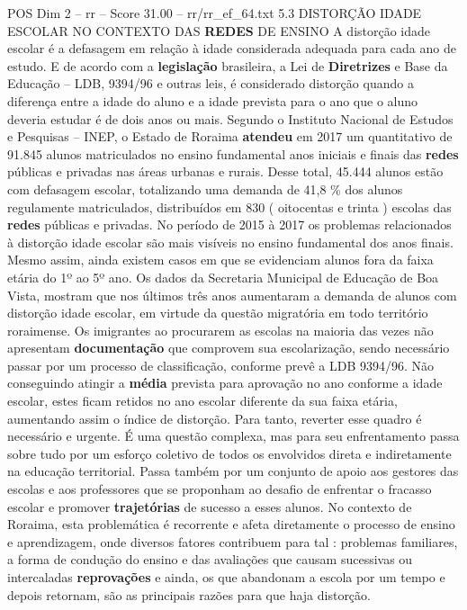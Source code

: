 \begin{textsample}{POS Dim 2 – rr – Score 31.00 – rr/rr\_ef\_64.txt}  \label{ex:f2_pos_106}
5.3 DISTORÇÃO IDADE ESCOLAR NO CONTEXTO DAS \textbf{REDES} DE ENSINO A distorção idade escolar é a defasagem em relação à idade considerada adequada para cada ano de estudo.
E de acordo com a \textbf{legislação} brasileira, a Lei de \textbf{Diretrizes} e Base da Educação – LDB, 9394/96 e outras leis, é considerado distorção quando a diferença entre a idade do aluno e a idade prevista para o ano que o aluno deveria estudar é de dois anos ou mais.
Segundo o Instituto Nacional de Estudos e Pesquisas – INEP, o Estado de Roraima \textbf{atendeu} em 2017 um quantitativo de 91.845 alunos matriculados no ensino fundamental anos iniciais e finais das \textbf{redes} públicas e privadas nas áreas urbanas e rurais.
Desse total, 45.444 alunos estão com defasagem escolar, totalizando uma demanda de 41,8 \% dos alunos regulamente matriculados, distribuídos em 830 ( oitocentas e trinta ) escolas das \textbf{redes} públicas e privadas.
No período de 2015 à 2017 os problemas relacionados à distorção idade escolar são mais visíveis no ensino fundamental dos anos finais.
Mesmo assim, ainda existem casos em que se evidenciam alunos fora da faixa etária do 1º ao 5º ano.
Os dados da Secretaria Municipal de Educação de Boa Vista, mostram que nos últimos três anos aumentaram a demanda de alunos com distorção idade escolar, em virtude da questão migratória em todo território roraimense.
Os imigrantes ao procurarem as escolas na maioria das vezes não apresentam \textbf{documentação} que comprovem sua escolarização, sendo necessário passar por um processo de classificação, conforme prevê a LDB 9394/96.
Não conseguindo atingir a \textbf{média} prevista para aprovação no ano conforme a idade escolar, estes ficam retidos no ano escolar diferente da sua faixa etária, aumentando assim o índice de distorção.
Para tanto, reverter esse quadro é necessário e urgente.
É uma questão complexa, mas para seu enfrentamento passa sobre tudo por um esforço coletivo de todos os envolvidos direta e indiretamente na educação territorial.
Passa também por um conjunto de apoio aos gestores das escolas e aos professores que se proponham ao desafio de enfrentar o fracasso escolar e promover \textbf{trajetórias} de sucesso a esses alunos.
No contexto de Roraima, esta problemática é recorrente e afeta diretamente o processo de ensino e aprendizagem, onde diversos fatores contribuem para tal : problemas familiares, a forma de condução do ensino e das avaliações que causam sucessivas ou intercaladas \textbf{reprovações} e ainda, os que abandonam a escola por um tempo e depois retornam, são as principais razões para que haja distorção.

\end{textsample}
